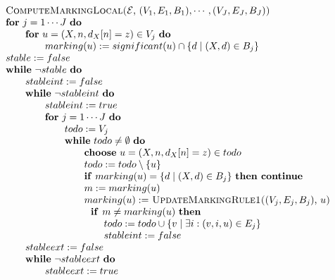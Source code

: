 \begin{equation*}
\begin{array}{l}
\begin{tabular}{l}
\textsc{ComputeMarkingLocal(}$\mathcal{E}$, $(V_{1},E_{1},B_{1}),\cdots
,(V_{J},E_{J},B_{J})$\textsc{)} \\ 
\textbf{for} $j=1\cdots J$ \textbf{do} \\ 
$\qquad $\textbf{for} $u=(X,n,d_{X}[n]=z)\in V_{j}$ \textbf{do} \\ 
$\qquad \qquad marking(u):=significant(u)\cap \{d\mid (X,d)\in B_{j}\}$ \\ 
$stable:=false$ \\ 
\textbf{while} $\lnot stable$ \textbf{do} \\ 
$\qquad stableint:=false$ \\ 
$\qquad $\textbf{while} $\lnot stableint$ \textbf{do} \\ 
$\qquad \qquad stableint:=true$ \\ 
$\qquad \qquad $\textbf{for} $j=1\cdots J$ \textbf{do} \\ 
$\qquad \qquad \qquad todo:=V_{j}$ \\ 
$\qquad \qquad \qquad $\textbf{while} $todo\neq \emptyset $ \textbf{do} \\ 
$\qquad \qquad \qquad \qquad $\textbf{choose} $u=(X,n,d_{X}[n]=z)\in todo$
\\ 
$\qquad \qquad \qquad \qquad todo:=todo\setminus \{u\}$ \\ 
$\qquad \qquad \qquad \qquad $\textbf{if} $marking(u)=\{d\mid (X,d)\in
B_{j}\}$ \textbf{then continue} \\ 
$\qquad \qquad \qquad \qquad m:=marking(u)$ \\ 
$\qquad \qquad \qquad \qquad marking(u):=$ \textsc{UpdateMarkingRule1(}$%
(V_{j},E_{j},B_{j})$, $u$\textsc{)} \\ 
$\qquad \qquad \qquad \qquad \text{\textbf{if }}m\neq marking(u)$ \textbf{%
then} \\ 
$\qquad \qquad \qquad \qquad \qquad todo:=todo\cup \{v\mid \exists
i:(v,i,u)\in E_{j}\}$ \\ 
$\qquad \qquad \qquad \qquad \qquad stableint:=false$ \\ 
$\qquad stableext:=false$%
\end{tabular}
\\ 
\begin{tabular}{l}
$\qquad $\textbf{while} $\lnot stableext$ \textbf{do} \\ 
$\qquad \qquad stableext:=true$ \\ 

\end{tabular}
\end{array}
\end{equation*}
